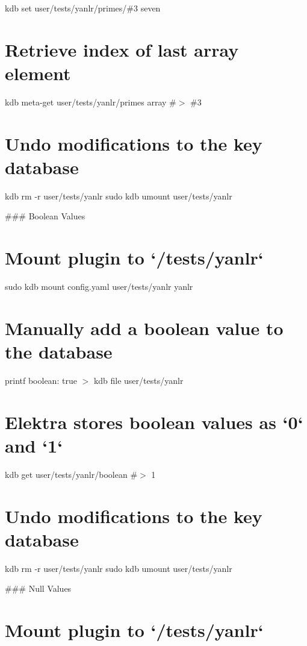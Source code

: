 kdb set user/tests/yanlr/primes/\#3 seven\hypertarget{autotoc_md955_autotoc_md971}{}\section{Retrieve index of last array element}\label{autotoc_md955_autotoc_md971}
kdb meta-\/get user/tests/yanlr/primes array \#$>$ \#3\hypertarget{autotoc_md955_autotoc_md972}{}\section{Undo modifications to the key database}\label{autotoc_md955_autotoc_md972}
kdb rm -\/r user/tests/yanlr sudo kdb umount user/tests/yanlr 
\begin{DoxyCode}
### Boolean Values
\end{DoxyCode}
 \hypertarget{autotoc_md955_autotoc_md973}{}\section{Mount plugin to `/tests/yanlr`}\label{autotoc_md955_autotoc_md973}
sudo kdb mount config.\+yaml user/tests/yanlr yanlr\hypertarget{autotoc_md955_autotoc_md974}{}\section{Manually add a boolean value to the database}\label{autotoc_md955_autotoc_md974}
printf \textquotesingle{}boolean\+: true\textquotesingle{} $>$ {\ttfamily kdb file user/tests/yanlr}\hypertarget{autotoc_md955_autotoc_md975}{}\section{Elektra stores boolean values as `0` and `1`}\label{autotoc_md955_autotoc_md975}
kdb get user/tests/yanlr/boolean \#$>$ 1\hypertarget{autotoc_md955_autotoc_md976}{}\section{Undo modifications to the key database}\label{autotoc_md955_autotoc_md976}
kdb rm -\/r user/tests/yanlr sudo kdb umount user/tests/yanlr 
\begin{DoxyCode}
### Null Values
\end{DoxyCode}
 \hypertarget{autotoc_md955_autotoc_md977}{}\section{Mount plugin to `/tests/yanlr`}\label{autotoc_md955_autotoc_md977}
